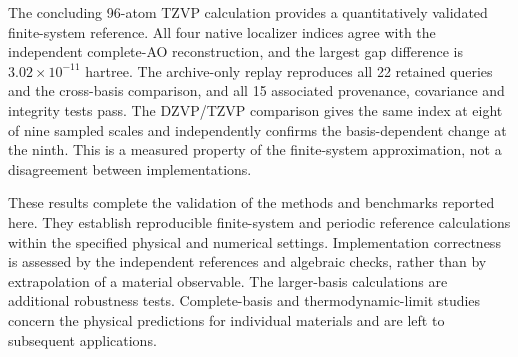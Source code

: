 \documentclass[11pt]{article}
\begin{document}
The concluding 96-atom TZVP calculation provides a quantitatively
validated finite-system reference. All four native localizer indices
agree with the independent complete-AO reconstruction, and the largest
gap difference is $3.02\times10^{-11}$ hartree. The archive-only replay
reproduces all 22 retained queries and the cross-basis comparison,
and all 15 associated provenance, covariance and integrity tests pass.
The DZVP/TZVP comparison gives the same index at eight of nine sampled
scales and independently confirms the basis-dependent change at the
ninth. This is a measured property of the finite-system approximation,
not a disagreement between implementations.

These results complete the validation of the methods and benchmarks
reported here. They establish reproducible finite-system and periodic
reference calculations within the specified physical and numerical
settings. Implementation correctness is assessed by the independent
references and algebraic checks, rather than by extrapolation of a
material observable. The larger-basis calculations are additional
robustness tests. Complete-basis and thermodynamic-limit studies concern
the physical predictions for individual materials and are left to
subsequent applications.
\end{document}
